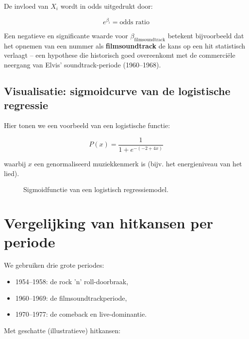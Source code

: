 \documentclass{book}
\begin{document}
	De invloed van $X_i$ wordt in odds uitgedrukt door:
	
	\[
	e^{\beta_i} = \text{odds ratio}
	\]
	
	Een negatieve en significante waarde voor $\beta_{\text{filmsoundtrack}}$ betekent bijvoorbeeld dat het opnemen 
	van een nummer als \textbf{filmsoundtrack} de kans op een hit statistisch verlaagt -- een hypothese die 
	historisch goed overeenkomt met de commerci\"ele neergang van Elvis' soundtrack-periode (1960--1968).
	
	\subsection{Visualisatie: sigmoidcurve van de logistische regressie}
	
	Hier tonen we een voorbeeld van een logistische functie:
	
	\[
	P(x) = \frac{1}{1 + e^{- ( -2 + 4x )}}
	\]
	
	waarbij $x$ een genormaliseerd muziekkenmerk is (bijv. het energieniveau van het lied).
	
	\begin{figure}[h!]
		\centering
		\caption{Sigmoidfunctie van een logistisch regressiemodel.}
		\label{fig:sigmoid}
	\end{figure}
	
	\section{Vergelijking van hitkansen per periode}
	
	We gebruiken drie grote periodes:
	
	\begin{itemize}
		\item 1954--1958: de rock 'n' roll-doorbraak,
		\item 1960--1969: de filmsoundtrackperiode,
		\item 1970--1977: de comeback en live-dominantie.
	\end{itemize}
	
	Met geschatte (illustratieve) hitkansen:
	
\end{document}
